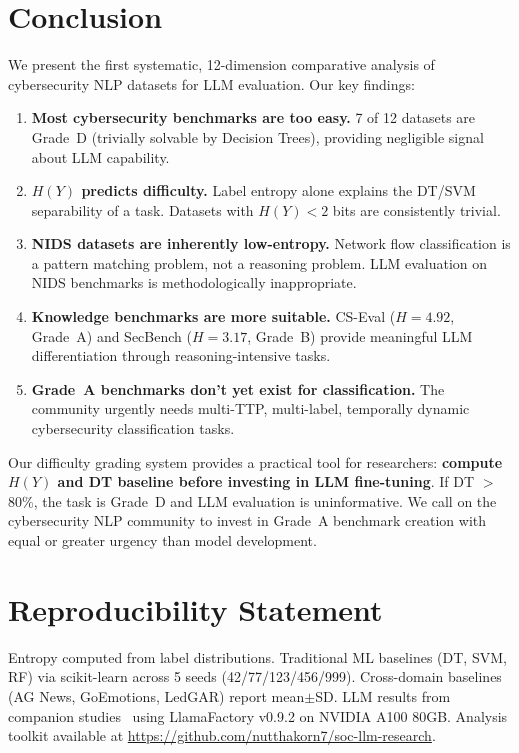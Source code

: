 \documentclass[journal]{IEEEtran}
\begin{document}
\section{Conclusion}

We present the first systematic, 12-dimension comparative analysis of cybersecurity NLP datasets for LLM evaluation. Our key findings:

\begin{enumerate}
\item \textbf{Most cybersecurity benchmarks are too easy.} 7 of 12 datasets are Grade~D (trivially solvable by Decision Trees), providing negligible signal about LLM capability.
\item \textbf{$H(Y)$ predicts difficulty.} Label entropy alone explains the DT/SVM separability of a task. Datasets with $H(Y) < 2$ bits are consistently trivial.
\item \textbf{NIDS datasets are inherently low-entropy.} Network flow classification is a pattern matching problem, not a reasoning problem. LLM evaluation on NIDS benchmarks is methodologically inappropriate.
\item \textbf{Knowledge benchmarks are more suitable.} CS-Eval ($H = 4.92$, Grade~A) and SecBench ($H = 3.17$, Grade~B) provide meaningful LLM differentiation through reasoning-intensive tasks.
\item \textbf{Grade~A benchmarks don't yet exist for classification.} The community urgently needs multi-TTP, multi-label, temporally dynamic cybersecurity classification tasks.
\end{enumerate}

Our difficulty grading system provides a practical tool for researchers: \textbf{compute $H(Y)$ and DT baseline before investing in LLM fine-tuning}. If DT $>$ 80\%, the task is Grade~D and LLM evaluation is uninformative. We call on the cybersecurity NLP community to invest in Grade~A benchmark creation with equal or greater urgency than model development.

\section*{Reproducibility Statement}
Entropy computed from label distributions. Traditional ML baselines (DT, SVM, RF) via scikit-learn across 5 seeds (42/77/123/456/999). Cross-domain baselines (AG News, GoEmotions, LedGAR) report mean$\pm$SD. LLM results from companion studies~\cite{p3,p6} using LlamaFactory v0.9.2 on NVIDIA A100 80GB. Analysis toolkit available at \url{https://github.com/nutthakorn7/soc-llm-research}.
\end{document}
